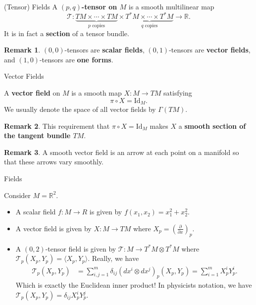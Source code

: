 \documentclass[usenames,dvipsnames]{beamer}
\theoremstyle{definition}
\newtheorem*{remark}{Remark}
\theoremstyle{theorem}
\newcommand{\R}{\mathbb{R}}
\begin{document}
        \begin{frame}{(Tensor) Fields}
            A \textbf{$(p,q)$-tensor on $M$} is a smooth multilinear map
            \[
            \mathcal{T}\colon \underbrace{TM\times\cdots \times TM}_{p \textrm{~copies}}\times \underbrace{T^*M\times \cdots \times T^*M}_{q \textrm{~copies}} \to \R.
            \]
            It is in fact a \textbf{section} of a tensor bundle. 
            \begin{remark}
                $(0,0)$-tensors are \textbf{scalar fields}, $(0,1)$-tensors are \textbf{vector fields}, and $(1,0)$-tensors are \textbf{one forms}.
            \end{remark}
        \end{frame}
        
        \begin{frame}{Vector Fields}
            \begin{definition}
                A \textbf{vector field} on $M$ is a smooth map $X \colon M \to TM$ satisfying
                \[
                    \pi \circ X = \textrm{Id}_M.
                \]
                We usually denote the space of all vector fields by $\Gamma(TM).$
            \end{definition}
            \begin{remark}
                This requirement that $\pi \circ X = \textrm{Id}_M$ makes $X$ a \textbf{smooth section of the tangent bundle $TM$}.
            \end{remark}
            \begin{remark}
                A smooth vector field is an arrow at each point on a manifold so that these arrows vary smoothly.
            \end{remark}
        \end{frame}
        
        \begin{frame}{Fields}
            \begin{example}
                Consider $M=\R^2$. 
                \begin{itemize}
                    \item A scalar field $f\colon M \to R$ is given by $f(x_1,x_2)=x_1^2+x_2^2.$
                    \item A vector field is given by $X\colon M \to TM$ where $X_p = \left(\frac{\partial}{\partial x}\right)_p$.
                    \item A $(0,2)$-tensor field is given by $\mathcal{T}\colon M \to T^*M \otimes T^*M$ where $\mathcal{T}_p(X_p,Y_p)=\langle X_p, Y_p \rangle.$ Really, we have
                    \begin{align*}
                        \mathcal{T}_p(X_p,Y_p)&= \sum_{i,j=1}^m\delta_{ij}(dx^i \otimes dx^j)_p(X_p,Y_p)=\sum_{i=1}^m X_p^i Y_p^i.
                    \end{align*}
                    Which is exactly the Euclidean inner product! In physicists notation, we have $\mathcal{T}_p(X_p,Y_p)=\delta_{ij}X_p^iY_p^j.$
                \end{itemize}
            \end{example}
        \end{frame}
\end{document}
